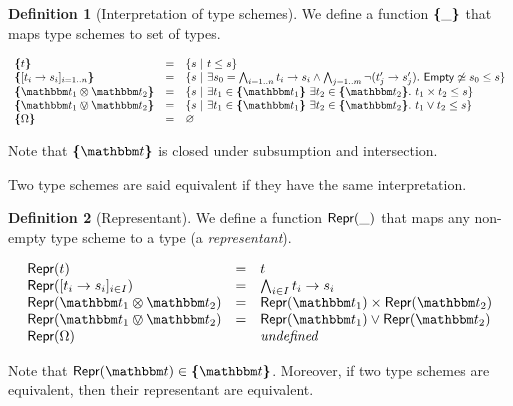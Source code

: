 \documentclass[a4paper]{article}
\theoremstyle{definition}
\newtheorem{definition}{Definition}
\begin{document}
    \begin{definition}[Interpretation of type schemes]
      We define a function $\textbf{\textup{\{}}\_\textbf{\textup{\}}}$ that maps type schemes to set of types.

      \begin{align*}
        \begin{array}{lcl}
        \tsint t &=& \{s\alt t \leq s\}\\
        \tsint {\tsfunone {t_i} {s_i}_{i=1..n}} &=& \{s\alt
        \exists s_0 = \bigwedge_{i=1..n} \arrow {t_i} {s_i}
        \land \bigwedge_{j=1..m} \neg (\arrow {t_j'} {s_j'}).\ 
        \Empty \not\simeq s_0 \leq s \}\\
        \tsint {\ts_1 \tstimes \ts_2} &=& \{s\alt \exists t_1 \in \tsint {\ts_1}\ 
        \exists t_2 \in \tsint {\ts_2}.\ \pair {t_1} {t_2} \leq s\}\\
        \tsint {\ts_1 \tsor \ts_2} &=& \{s\alt \exists t_1 \in \tsint {\ts_1}\ 
        \exists t_2 \in \tsint {\ts_2}.\ {t_1} \vee {t_2} \leq s\}\\
        \tsint \tsempty &=& \varnothing
        \end{array}
      \end{align*}

    Note that $\tsint \ts$ is closed under subsumption and intersection.
    
    Two type schemes are said equivalent if they have the same interpretation.
    \end{definition}

    \begin{definition}[Representant]
      We define a function $\textsf{Repr}(\_)$ that maps any non-empty type scheme to a type (a \textit{representant}).

      \begin{align*}
        \begin{array}{lcl}
        \tsrep t &=& t\\
        \tsrep {\tsfunone {t_i} {s_i}_{i\in I}} &=& \bigwedge_{i\in I} \arrow {t_i} {s_i}\\
        \tsrep {\ts_1 \tstimes \ts_2} &=& \pair {\tsrep {\ts_1}} {\tsrep {\ts_2}}\\
        \tsrep {\ts_1 \tsor \ts_2} &=& \tsrep {\ts_1} \vee \tsrep {\ts_2}\\
        \tsrep \tsempty && \textit{undefined}
        \end{array}
      \end{align*}

    Note that $\tsrep \ts \in \tsint \ts$. Moreover, if two type schemes are equivalent, then their representant are equivalent.
    \end{definition}
\end{document}
